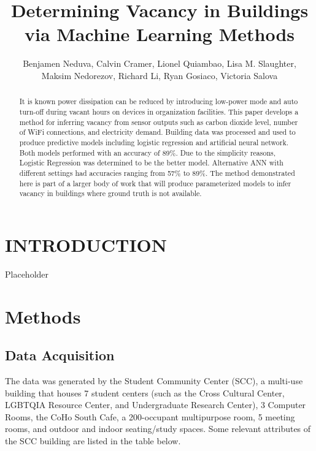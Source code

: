 \documentclass[letterpaper, 12 pt, conference]{ieeeconf}  %
\title{\LARGE \bf
Determining Vacancy in Buildings via Machine Learning Methods
}
\author{Benjamen Neduva, Calvin Cramer, Lionel Quiambao, Lisa M. Slaughter, \\
        Maksim Nedorezov, Richard Li, Ryan Gosiaco, Victoria Salova}
\begin{document}
\maketitle
\thispagestyle{empty}
\pagestyle{empty}


\begin{abstract}

It is known power dissipation can be reduced by introducing low-power mode and auto turn-off during vacant hours on devices in organization facilities. This paper develops a method for inferring vacancy from sensor outputs such as carbon dioxide level, number of WiFi connections, and electricity demand. Building data was processed and used to produce predictive models including logistic regression and artificial neural network. Both models performed with an accuracy of 89\%. Due to the simplicity reasons, Logistic Regression was determined to be the better model. Alternative ANN with different settings had accuracies ranging from 57\% to 89\%. The method demonstrated here is part of a larger body of work that will produce parameterized models to infer vacancy in buildings where ground truth is not available. 

\end{abstract}

\section{INTRODUCTION}

Placeholder

\section{Methods}

\subsection{Data Acquisition}

The data was generated by the Student Community Center (SCC), a multi-use building that houses 7 student centers (such as the Cross Cultural Center, LGBTQIA Resource Center, and Undergraduate Research Center), 3 Computer Rooms, the CoHo South Cafe, a 200-occupant multipurpose room, 5 meeting rooms, and outdoor and indoor seating/study spaces. Some relevant attributes of the SCC building are listed in the table below. 
\end{document}
